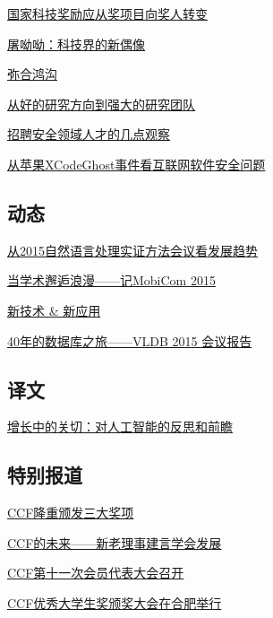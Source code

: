\documentclass[a4paper]{article}
\begin{document}
\href{http://history.ccf.org.cn/resources/1190201776262/2015/11/12/8.pdf}{国家科技奖励应从奖项目向奖人转变}

\href{http://history.ccf.org.cn/resources/1190201776262/2015/11/12/9.pdf}{屠呦呦：科技界的新偶像}

\href{http://history.ccf.org.cn/resources/1190201776262/2015/11/12/14.pdf}{弥合鸿沟}

\href{http://history.ccf.org.cn/resources/1190201776262/2015/11/12/12.pdf}{从好的研究方向到强大的研究团队}

\href{http://history.ccf.org.cn/resources/1190201776262/2015/11/12/13.pdf}{招聘安全领域人才的几点观察}

\href{http://history.ccf.org.cn/resources/1190201776262/2015/11/12/10.pdf}{从苹果XCodeGhost事件看互联网软件安全问题}

\subsection{动态}
\href{http://history.ccf.org.cn/resources/1190201776262/2015/11/12/16.pdf}{从2015自然语言处理实证方法会议看发展趋势}

\href{http://history.ccf.org.cn/resources/1190201776262/2015/11/12/17.pdf}{当学术邂逅浪漫——记MobiCom 2015}

\href{http://history.ccf.org.cn/resources/1190201776262/2015/11/12/18.pdf}{新技术 \& 新应用}

\href{http://history.ccf.org.cn/resources/1190201776262/2015/11/12/15.pdf}{40年的数据库之旅——VLDB 2015 会议报告}

\subsection{译文}
\href{http://history.ccf.org.cn/resources/1190201776262/2015/11/12/19.pdf}{增长中的关切：对人工智能的反思和前瞻}

\subsection{特别报道}
\href{http://history.ccf.org.cn/resources/1190201776262/2015/11/12/20.pdf}{CCF隆重颁发三大奖项}

\href{http://history.ccf.org.cn/resources/1190201776262/2015/11/12/23.pdf}{CCF的未来——新老理事建言学会发展}

\href{http://history.ccf.org.cn/resources/1190201776262/2015/11/12/22.pdf}{CCF第十一次会员代表大会召开}

\href{http://history.ccf.org.cn/resources/1190201776262/2015/11/12/21.pdf}{CCF优秀大学生奖颁奖大会在合肥举行}
\end{document}
